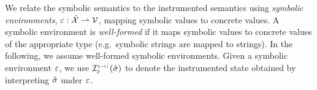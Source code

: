 %

We relate the symbolic semantics to the instrumented semantics using 
\emph{symbolic environments}, $\varepsilon : \hat{\mathcal{X}} \rightharpoonup \mathcal{V}$, mapping 
symbolic values to concrete values. 
A symbolic environment is \emph{well-formed} if it maps symbolic 
values to concrete values of the appropriate type (e.g.~symbolic strings are mapped to strings). In the following, we  
assume well-formed symbolic environments. 
%
Given a symbolic environment $\varepsilon$, we use $\interpret{\symbinst}{\senv}(\sstate)$ to 
denote the instrumented state obtained by interpreting $\hat{\sigma}$ under $\varepsilon$.  

